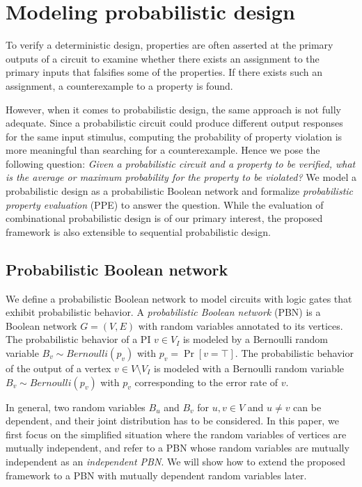 \section{Modeling probabilistic design}
\label{sect:prob-formulation}

To verify a deterministic design,
properties are often asserted at the primary outputs of a circuit to examine whether
there exists an assignment to the primary inputs that falsifies some of the properties.
If there exists such an assignment,
a counterexample to a property is found.

However, when it comes to probabilistic design,
the same approach is not fully adequate.
Since a probabilistic circuit could produce different output responses for the same input stimulus,
computing the probability of property violation is more meaningful than searching for a counterexample.
Hence we pose the following question:
\textit{
    Given a probabilistic circuit and a property to be verified,
    what is the average or maximum probability for the property to be violated?
}
We model a probabilistic design as a probabilistic Boolean network and
formalize \textit{probabilistic property evaluation} (PPE) to answer the question.
While the evaluation of combinational probabilistic design is of our primary interest,
the proposed framework is also extensible to sequential probabilistic design.

\subsection{Probabilistic Boolean network}
We define a probabilistic Boolean network to model circuits with logic gates that exhibit probabilistic behavior.
A \textit{probabilistic Boolean network} (PBN) is a Boolean network $G=(V,E)$ with random variables annotated to its vertices.
The probabilistic behavior of a PI $v \in V_I$ is modeled by a Bernoulli random variable
$B_v\sim\textit{Bernoulli}(p_v)$ with $p_v=\Pr[v=\top]$.
The probabilistic behavior of the output of a vertex $v \in V\setminus V_I$ is modeled with a Bernoulli random variable $B_v\sim\textit{Bernoulli}(p_v)$ with $p_v$ corresponding to the error rate of $v$.

In general,
two random variables $B_u$ and $B_v$ for $u,v \in V$ and $u \neq v$ can be dependent,
and their joint distribution has to be considered.
In this paper,
we first focus on the simplified situation where the random variables of vertices are mutually independent,
and refer to a PBN whose random variables are mutually independent as an \textit{independent PBN}.
We will show how to extend the proposed framework to a PBN with mutually dependent random variables later.

